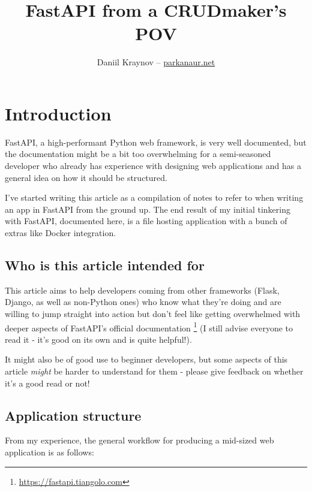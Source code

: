 \documentclass[14pt]{extarticle}
\title{FastAPI from a CRUDmaker's POV}
\author{Daniil Kraynov -- \href{https://parkanaur.net}{parkanaur.net}}
\begin{document}
\maketitle

{\hypersetup{linkcolor=black}
\tableofcontents}

\section{Introduction}

FastAPI, a high-performant Python web framework, is very well documented, but the documentation might be a bit too overwhelming for a semi-seasoned developer who already has experience with designing web applications and has a general idea on how it should be structured.

I've started writing this article as a compilation of notes to refer to when writing an app in FastAPI from the ground up. The end result of my initial tinkering with FastAPI, documented here, is a file hosting application with a bunch of extras like Docker integration.

\subsection{Who is this article intended for}

This article aims to help developers coming from other frameworks (Flask, Django, as well as non-Python ones) who know what they're doing and are willing to jump straight into action but don't feel like getting overwhelmed with deeper aspects of FastAPI's official documentation \footnote{\href{https://fastapi.tiangolo.com}{https://fastapi.tiangolo.com}} (I still advise everyone to read it - it's good on its own and is quite helpful!).

It might also be of good use to beginner developers, but some aspects of this article \textit{might} be harder to understand for them - please give feedback on whether it's a good read or not!

\subsection{Application structure}

From my experience, the general workflow for producing a mid-sized web application is as follows:
\end{document}
